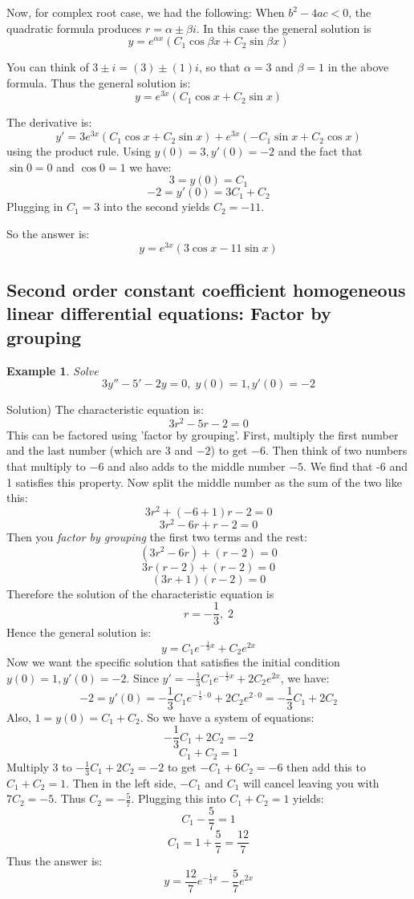 \documentclass[12pt]{report}
\newtheorem{ex}{Example}[section]
\begin{document}
Now, for complex root case, we had the following:
 When $b^2-4ac<0$, the quadratic formula produces $r= \alpha \pm \beta i $. In this case the general solution is
$$ y=e^{\alpha x} (C_1 \cos \beta x + C_2 \sin \beta x) $$

You can think of $3\pm i = (3) \pm (1)i$, so that $\alpha =3$ and $\beta=1$ in the above formula. Thus the general solution is:
$$ y=e^{3 x} (C_1 \cos x + C_2 \sin x) $$

The derivative is:
$$ y' = 3 e^{3 x} (C_1 \cos x + C_2 \sin x)+e^{3 x} (-C_1 \sin x + C_2 \cos x) $$
using the product rule.
Using $y(0)=3, y'(0)=-2$ and the fact that $\sin 0 =0$ and $\cos 0 =1$ we have:
$$3 = y(0) = C_1$$
$$-2 = y'(0) = 3 C_1 + C_2$$
Plugging in $C_1=3$ into the second yields $C_2= -11$.

So the answer is:
$$ y=e^{3 x} (3 \cos x -11 \sin x) $$

\subsection*{ Second order constant coefficient homogeneous linear differential equations: Factor by grouping}

\begin{ex} Solve
$$3y''-5'-2y=0, \; y(0)=1, y'(0)=-2$$
\end{ex}
Solution) The characteristic equation is:
$$3r^2 -5r -2=0$$
This can be factored using 'factor by grouping'. First, multiply the first number and the last number (which are $3$ and $-2$) to get $-6$. Then think of two numbers that multiply to $-6$ and also adds to the middle number $-5$. We find that -6 and 1 satisfies this property. Now split the middle number as the sum of the two like this:
$$3r^2 +(-6+1)r -2=0$$
$$3r^2 -6r + r -2=0$$
Then you \textit{factor by grouping} the first two terms and the rest:
$$(3r^2 -6r) + (r -2)=0$$
$$3r(r-2) + (r -2)=0$$
$$ (3r+1)(r-2) =0$$
Therefore the solution of the characteristic equation is
$$r = -\frac{1}{3}, \; 2$$
Hence the general solution is:
$$ y=C_1 e^{-\frac{1}{3} x}+ C_2 e^{2 x}$$
Now we want the specific solution that satisfies the initial condition $ y(0)=1, y'(0)=-2$. Since $y' = -\frac{1}{3}C_1 e^{-\frac{1}{3} x}+ 2 C_2 e^{2 x}$, we have:
$$-2 = y'(0) = -\frac{1}{3}C_1 e^{-\frac{1}{3} \cdot 0}+ 2 C_2 e^{2 \cdot 0} = -\frac{1}{3}C_1+2 C_2$$
Also, $1=y(0)= C_1+ C_2 $. So we have a system of equations:
$$-\frac{1}{3}C_1+2 C_2 = -2$$
$$C_1 + C_2 = 1$$
Multiply 3 to $-\frac{1}{3}C_1+2 C_2 = -2$ to get $-C_1+6C_2=-6$ then add this to $C_1 + C_2 = 1$. Then in the left side, $-C_1$ and $C_1$ will cancel leaving you with $7 C_2 =-5$. Thus $C_2 = -\frac{5}{7}$. Plugging this into $C_1 + C_2 = 1$ yields:
$$C_1 -\frac{5}{7} =1$$
$$C_1 = 1+\frac{5}{7}=\frac{12}{7}$$
Thus the answer is:
$$ y=\frac{12}{7} e^{-\frac{1}{3} x}-\frac{5}{7} e^{2 x}$$
\end{document}
